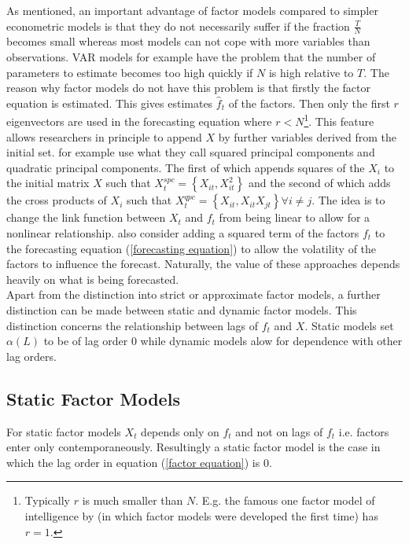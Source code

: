 \documentclass[11pt]{article}
\begin{document}
As mentioned, an important advantage of factor models compared to simpler econometric models is that they do not necessarily suffer if the fraction $\frac{T}{N}$ becomes small whereas most models can not cope with more variables than observations. VAR models for example have the problem that the number of parameters to estimate becomes too high quickly if $N$ is high relative to $T$. 
The reason why factor models do not have this problem is that firstly the factor equation is estimated. This gives estimates $\hat f_t$ of the factors. Then only the first $r$ eigenvectors are used in the forecasting equation where $r<N$\footnote{Typically $r$ is much smaller than $N$. E.g. the famous one factor model of intelligence by \citet{spearman1904general} (in which factor models were developed the first time) has $r=1$.}. This feature allows researchers in principle to append $X$ by further variables derived from the initial set. \citet{bai2008forecasting} for example use what they call squared principal components and quadratic principal components. The first of which appends squares of the $X_i$ to the initial matrix $X$ such that $X_{t}^{spc}=\left\{X_{it}, X_{it}^2\right\}$ and the second of which adds the cross products of $X_i$ such that $X_t^{qpc} = \left\{ X_{it}, X_{it} X_{jt}\right\} \forall i \not= j$. The idea is to change the link function between $X_t$ and $f_t$ from being linear to allow for a nonlinear relationship. \citet{bai2008forecasting} also consider adding a squared term of the factors $f_t$ to the forecasting equation (\ref{forecasting equation}) to allow the volatility of the factors to influence the forecast. Naturally, the value of these approaches depends heavily on what is being forecasted. \\

Apart from the distinction into strict or approximate factor models, a further distinction can be made between static and dynamic factor models. This distinction concerns the relationship between lags of $f_t$ and $X$. Static models set $\alpha(L)$ to be of lag order $0$ while dynamic models alow for dependence with other lag orders.


\subsection{Static Factor Models}
For static factor models $X_t$ depends only on $f_t$ and not on lags of $f_t$ i.e. factors enter only contemporaneously. Resultingly a static factor model is the case in which the lag order in equation (\ref{factor equation}) is 0.
\end{document}
